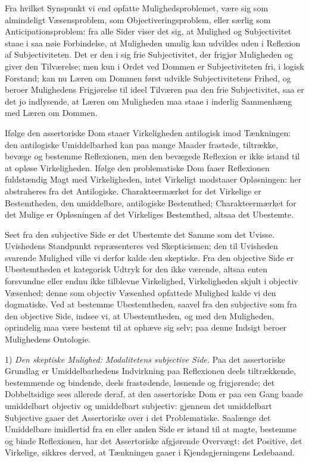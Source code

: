 \documentclass[12pt]{book}
\newcommand{\opage}[1]{\marginnote{\footnotesize\textit{[#1]}}}
\begin{document}
Fra hvilket Synspunkt vi end opfatte Mulighedsproblemet, være sig som almindeligt Væsensproblem, som Objectiveringsproblem, eller særlig som Anticipationsproblem: fra alle Sider viser det sig, at Mulighed og Subjectivitet staae i saa nøie Forbindelse, at Muligheden umulig kan udvikles uden i Reflexion af Subjectiviteten. Det er den i sig frie Subjectivitet, der frigjør Muligheden og giver den Tilværelse; men kun i Ordet ved Dommen er Subjectiviteten fri, i logisk Forstand; kan nu Læren om Dommen først udvikle Subjectivitetens Frihed, og beroer Mulighedens Frigjørelse til ideel Tilværen paa den frie Subjectivitet, saa er det jo indlysende, at Læren om Muligheden maa staae i inderlig Sammenhæng med Læren om Dommen.

Ifølge den assertoriske Dom staaer Virkeligheden antilogisk imod Tænkningen: den antilogiske Umiddelbarhed kan paa mange Maader frastøde, tiltrække, bevæge og bestemme Reflexionen, men den bevægede Reflexion er ikke istand til at
\opage{212}opløse Virkeligheden. Ifølge den problematiske Dom faaer Reflexionen fuldstændig Magt med Virkeligheden, intet Virkeligt modstaaer Opløsningen: her abstraheres fra det Antilogiske. Charakteermærket for det Virkelige er Bestemtheden, den umiddelbare, antilogiske Bestemthed; Charakteermærket for det Mulige er Opløsningen af det Virkeliges Bestemthed, altsaa det Ubestemte.

Seet fra den subjective Side er det Ubestemte det Samme som det Uvisse. Uvishedens Standpunkt repræsenteres ved Skepticismen; den til Uvisheden svarende Mulighed ville vi derfor kalde den skeptiske. Fra den objective Side er Ubestemtheden et kategorisk Udtryk for den ikke værende, altsaa enten forsvundne eller endnu ikke tilblevne Virkelighed, Virkeligheden skjult i objectiv Væsenhed; denne som objectiv Væsenhed opfattede Mulighed kalde vi den dogmatiske. Ved at bestemme Ubestemtheden, saavel fra den subjective som fra den objective Side, indsee vi, at Ubestemtheden, og med den Muligheden, oprindelig maa være bestemt til at ophæve sig selv; paa denne Indsigt beroer Mulighedens Ontologie.

1) \emph{Den skeptiske Mulighed: Modalitetens subjective Side.} Paa det assertoriske Grundlag er Umiddelbarhedens Indvirkning paa Reflexionen deels tiltrækkende, bestemmende og bindende, deels frastødende, løsnende og frigjørende; det Dobbeltsidige sees allerede deraf, at den assertoriske Dom er paa een Gang baade umiddelbart objectiv og umiddelbart subjectiv: gjennem det umiddelbart Subjective gaaer det Assertoriske over i det Problematiske. Saalænge det Umiddelbare imidlertid fra en eller anden Side er istand til at magte, bestemme og binde Reflexionen, har det Assertoriske afgjørende Overvægt: det Positive, det Virkelige, sikkres derved, at Tænkningen gaaer i Kjendsgjerningens Ledebaand.
\end{document}
